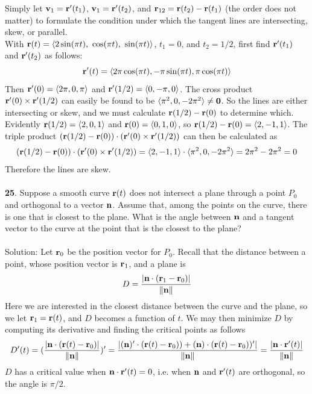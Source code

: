 \documentclass[12pt]{amsbook}
\newcommand{\la}{\langle}
\newcommand{\ra}{\rangle}
\begin{document}
Simply let ${\bf v}_1={\bf r}'(t_1)$, ${\bf v}_1={\bf r}'(t_2)$, and ${\bf r}_{12}={\bf r}(t_2)-{\bf r}(t_1)$ (the order does not matter) to formulate the condition under which the tangent lines are intersecting, skew, or parallel.
\\
With ${\bf r}(t)=\la 2\sin(\pi t), \ \cos(\pi t), \ \sin(\pi t) \ra$, $t_1 = 0$, and $t_2 = 1/2$, first find ${\bf r}'(t_1)$ and ${\bf r}'(t_2)$ as follows:
$${\bf r}'(t)=\la 2\pi\cos(\pi t), -\pi \sin(\pi t), \pi \cos(\pi t) \ra$$
Then ${\bf r}'(0)=\la 2\pi ,0 ,\pi \ra$ and ${\bf r}'(1/2)=\la 0, -\pi , 0 \ra$. The cross product ${\bf r}'(0)\times{\bf r}'(1/2)$ can easily be found to be $\la \pi^2, 0, -2\pi^2 \ra \neq {\bf 0}$. So the lines are either intersecting or skew, and we must calculate ${\bf r}(1/2)-{\bf r}(0)$ to determine which. Evidently ${\bf r}(1/2)=\la 2,0,1 \ra$ and ${\bf r}(0)=\la 0,1,0 \ra$, so ${\bf r}(1/2)-{\bf r}(0)=\la 2,-1,1 \ra$. The triple product $({\bf r}(1/2)-{\bf r}(0))\cdot({\bf r}'(0)\times{\bf r}'(1/2))$ can then be calculated as 
$$({\bf r}(1/2)-{\bf r}(0))\cdot({\bf r}'(0)\times{\bf r}'(1/2)) = \la 2,-1,1 \ra \cdot \la \pi^2,0,-2\pi^2 \ra =2\pi^2-2\pi^2= 0$$
Therefore the lines are skew.
\\
\\
{\small\bf 25}. Suppose a smooth curve ${\bf r}(t)$ does not intersect a plane through a point
$P_0$ and orthogonal to a vector ${\bf n}$. Assume that, among the points on the curve, there is one that is closest to the plane. What is the angle between ${\bf n}$ and a tangent vector to the curve at the point that is the closest to the plane?
\\
\\
{\sc Solution}: Let ${\bf r}_0$ be the position vector for $P_0$. Recall that the distance between a point, whose position vector is ${\bf r}_1$, and a plane is
$$D=\frac{|{\bf n}\cdot({\bf r}_1-{\bf r}_0)|}{\|{\bf n}\|}$$
Here we are interested in the closest distance between the curve and the plane, so we let ${\bf r}_1={\bf r}(t)$, and $D$ becomes a function of $t$. We may then minimize $D$ by computing its derivative and finding the critical points as follows
$$D'(t)=(\frac{|{\bf n}\cdot({\bf r}(t)-{\bf r}_0)|}{\|{\bf n}\|})'=\frac{|({\bf n})'\cdot({\bf r}(t)-{\bf r}_0))+({\bf n})\cdot({\bf r}(t)-{\bf r}_0))'|}{\|{\bf n}\|}=\frac{|{\bf n}\cdot{\bf r}'(t)|}{\|{\bf n}\|}$$
$D$ has a critical value when  ${\bf n}\cdot{\bf r}'(t)=0$, i.e. when ${\bf n}$ and ${\bf r}'(t)$ are orthogonal, so the angle is $\pi/2$.
\\
\\
\end{document}
